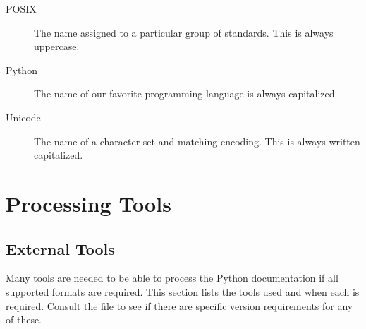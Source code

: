 \documentclass{howto}
\begin{document}
  \begin{description}
    \item[POSIX]
	The name assigned to a particular group of standards.  This is
	always uppercase.

    \item[Python]
	The name of our favorite programming language is always
	capitalized.

    \item[Unicode]
	The name of a character set and matching encoding.  This is
        always written capitalized.
  \end{description}


\section{Processing Tools}

  \subsection{External Tools}

    Many tools are needed to be able to process the Python
    documentation if all supported formats are required.  This
    section lists the tools used and when each is required.  Consult
    the  file to see if there are specific version
    requirements for any of these.
\end{document}
